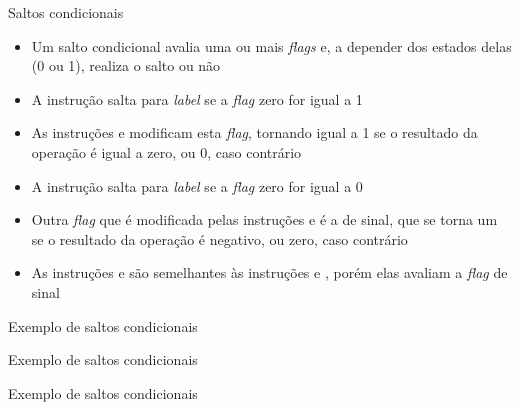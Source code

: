 \begin{frame}[fragile]{Saltos condicionais}

    \begin{itemize}
        \item Um salto condicional avalia uma ou mais \textit{flags} e, a depender dos estados
            delas (0 ou 1), realiza o salto ou não

        \item A instrução  salta para \textit{label} se a \textit{flag} zero for 
            igual a 1

        \item As instruções  e   modificam esta \textit{flag}, 
            tornando igual a 1 se o resultado da operação é igual a zero, ou 0, caso contrário

        \item A instrução  salta para \textit{label} se a \textit{flag} zero for 
            igual a 0

        \item Outra \textit{flag} que é modificada pelas instruções  e 
             é a de sinal, que se torna um se o resultado da operação é negativo,
            ou zero, caso contrário

        \item As instruções  e  são semelhantes às instruções
             e , porém elas avaliam a \textit{flag} de sinal
    \end{itemize}

\end{frame}

\begin{frame}[fragile]{Exemplo de saltos condicionais}
\end{frame}

\begin{frame}[fragile]{Exemplo de saltos condicionais}
\end{frame}

\begin{frame}[fragile]{Exemplo de saltos condicionais}
\end{frame}

